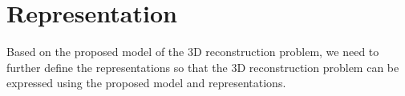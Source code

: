 

\section{Representation}
\label{sec:3DRecon_Rep}
Based on the proposed model of the 3D reconstruction problem, we need to further define the representations so that the 3D reconstruction problem can be expressed using the proposed model and representations.




